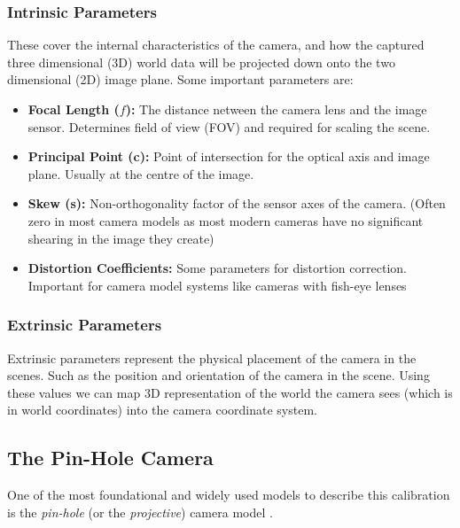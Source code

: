 \subsubsection{Intrinsic Parameters}\label{sec:intrinsic}

These cover the internal characteristics of the camera, and how the captured three dimensional (3D) world data will be projected down onto the two dimensional (2D) image plane.
Some important parameters are:

\begin{itemize}
  \item \textbf{Focal Length ($f$):} The distance netween the camera lens and the image sensor. Determines field of view (FOV) and required for scaling the scene.
  \item \textbf{Principal Point (c):} Point of intersection for the optical axis and image plane. Usually at the centre of the image.
  \item \textbf{Skew (s):} Non-orthogonality factor of the sensor axes of the camera. (Often zero in most camera models as most modern cameras have no significant shearing in the image they create)
  \item \textbf{Distortion Coefficients:} Some parameters for distortion correction. Important for camera model systems like cameras with fish-eye lenses \cite{king1989history}
\end{itemize}


\subsubsection{Extrinsic Parameters}
Extrinsic parameters represent the physical placement of the camera in the scenes. Such as the position and orientation of the camera in the scene. Using these values we can map  3D representation of the world the camera sees (which is in world coordinates) into the camera coordinate system.
\\

\subsection {The Pin-Hole Camera}
One of the most foundational and widely used models to describe this calibration is the \emph{pin-hole} (or the  \emph{projective}) camera model \cite{solem2012programming}. 

